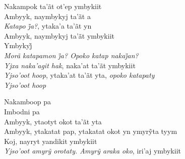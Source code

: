 \begin{linenumbers}\begingroup\raggedright

\noindent   Nakampok ta'ãt ot'ep ymbykiit\\
  Ambyyk, naymbykyj ta'ãt a\\
  \emph{Katapo j̃a?}, ytaka’a ta’ãt yn\\
  Ambyyk, naymbykyj ta'ãt ymbykiit\\
  Ymbykyj̃\\
  \emph{Morã katapamon j̃a? Opoko katap nakaj̃an?}\\
  \emph{Yjxa naka'agit hak}, naka'at ta'ãt ymbykiit\\
  \emph{Yjso'oot hoop}, ytaka'at ta'ãt yta, \emph{opoko katapaty}\\
  \emph{Yjso'oot hoop}

\end{linenumbers}\endgroup

\bigskip

\begin{linenumbers}\begingroup\raggedright

\noindent   Nakamboop pa\\
  Imbodni pa\\
  Ambyyk, ytaotyt okot ta'ãt yta\\
  Ambyyk, ytakatat pap, ytakatat okot yn ymyrỹta tyym\\
  Koj, nayryt yandikit ymbykiit\\
  \emph{Yjso’oot amyrỹ orotaty. Amyrỹ araka oko}, iri’aj ymbykiit

\end{linenumbers}\endgroup

